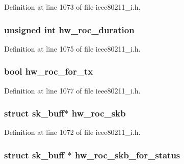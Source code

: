Definition at line 1073 of file ieee80211\-\_\-i.\-h.

\hypertarget{structieee80211__local_af4abb221fc61238c80b3b5c96f5d3c7b}{
\subsubsection[{hw\-\_\-roc\-\_\-duration}]{\setlength{\rightskip}{0pt plus 5cm}unsigned int hw\-\_\-roc\-\_\-duration}}\label{structieee80211__local_af4abb221fc61238c80b3b5c96f5d3c7b}


Definition at line 1075 of file ieee80211\-\_\-i.\-h.

\hypertarget{structieee80211__local_a7c4c5a9a800b0b54327da5a44b95f562}{
\subsubsection[{hw\-\_\-roc\-\_\-for\-\_\-tx}]{\setlength{\rightskip}{0pt plus 5cm}bool hw\-\_\-roc\-\_\-for\-\_\-tx}}\label{structieee80211__local_a7c4c5a9a800b0b54327da5a44b95f562}


Definition at line 1077 of file ieee80211\-\_\-i.\-h.

\hypertarget{structieee80211__local_aeec3c84d01b2997932d8a704fb332392}{
\subsubsection[{hw\-\_\-roc\-\_\-skb}]{\setlength{\rightskip}{0pt plus 5cm}struct sk\-\_\-buff$\ast$ hw\-\_\-roc\-\_\-skb}}\label{structieee80211__local_aeec3c84d01b2997932d8a704fb332392}


Definition at line 1072 of file ieee80211\-\_\-i.\-h.

\hypertarget{structieee80211__local_a3348475145fcc551a07a06e481f06837}{
\subsubsection[{hw\-\_\-roc\-\_\-skb\-\_\-for\-\_\-status}]{\setlength{\rightskip}{0pt plus 5cm}struct sk\-\_\-buff $\ast$ hw\-\_\-roc\-\_\-skb\-\_\-for\-\_\-status}}\label{structieee80211__local_a3348475145fcc551a07a06e481f06837}


